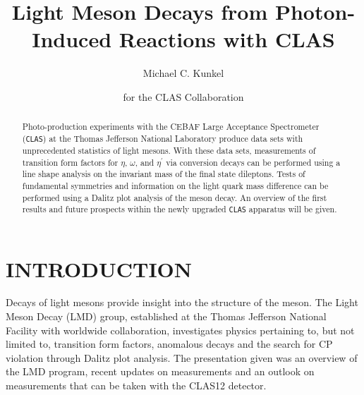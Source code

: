 \documentclass{aip-cp}
\begin{document}
\title{Light Meson Decays from Photon-Induced Reactions with CLAS}

\author[aff1]{Michael C. Kunkel}
\author[]{for the CLAS Collaboration }

\maketitle

\begin{abstract}
Photo-production experiments with the CEBAF Large Acceptance Spectrometer (\textsc{\texttt{CLAS}}) at the Thomas Jefferson National Laboratory produce data sets with unprecedented statistics of light mesons. With these data sets, measurements of transition form factors for $\eta$, $\omega$, and $\eta^\prime$ via conversion decays can be performed using a line shape analysis on the invariant mass of the final state dileptons. Tests of fundamental symmetries and information on the light quark mass difference can be performed using a Dalitz plot analysis of the meson decay. An overview of the first results and future prospects within the newly upgraded \textsc{\texttt{CLAS}} apparatus will be given.
\end{abstract}

\section{INTRODUCTION}
Decays of light mesons provide insight into the structure of the meson. The Light Meson Decay (LMD) group, established at the Thomas Jefferson National Facility with worldwide collaboration, investigates physics pertaining to, but not limited to, transition form factors, anomalous decays and the search for CP violation through Dalitz plot analysis. The presentation given was an overview of the LMD program, recent updates on measurements and an outlook on measurements that can be taken with the CLAS12 detector. 
\end{document}
